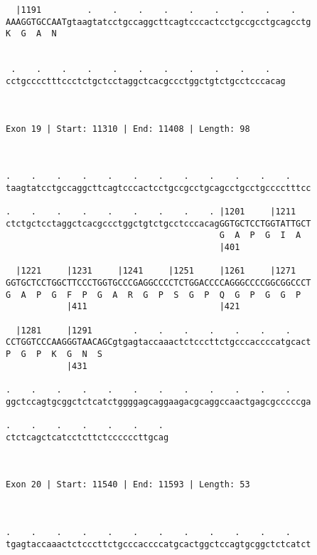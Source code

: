 \documentclass{article}
\begin{document}
\begin{Verbatim}
  |1191         .    .    .    .    .    .    .    .    .   
AAAGGTGCCAATgtaagtatcctgccaggcttcagtcccactcctgccgcctgcagcctg
K  G  A  N                                                  
                                                            
  
 .    .    .    .    .    .    .    .    .    .    .   
cctgcccctttccctctgctcctaggctcacgccctggctgtctgcctcccacag
                                                       
                                                       
 
Exon 19 | Start: 11310 | End: 11408 | Length: 98



.    .    .    .    .    .    .    .    .    .    .    .    
taagtatcctgccaggcttcagtcccactcctgccgcctgcagcctgcctgcccctttcc
                                                            
.    .    .    .    .    .    .    .    . |1201     |1211   
ctctgctcctaggctcacgccctggctgtctgcctcccacagGGTGCTCCTGGTATTGCT
                                          G  A  P  G  I  A  
                                          |401              
  
  |1221     |1231     |1241     |1251     |1261     |1271   
GGTGCTCCTGGCTTCCCTGGTGCCCGAGGCCCCTCTGGACCCCAGGGCCCCGGCGGCCCT
G  A  P  G  F  P  G  A  R  G  P  S  G  P  Q  G  P  G  G  P  
            |411                          |421              
  
  |1281     |1291        .    .    .    .    .    .    .    
CCTGGTCCCAAGGGTAACAGCgtgagtaccaaactctcccttctgcccaccccatgcact
P  G  P  K  G  N  S                                         
            |431                                            
  
.    .    .    .    .    .    .    .    .    .    .    .    
ggctccagtgcggctctcatctggggagcaggaagacgcaggccaactgagcgcccccga
                                                            
.    .    .    .    .    .    . 
ctctcagctcatcctcttctccccccttgcag
                                
                                
 
Exon 20 | Start: 11540 | End: 11593 | Length: 53



.    .    .    .    .    .    .    .    .    .    .    .    
tgagtaccaaactctcccttctgcccaccccatgcactggctccagtgcggctctcatct
                                                            

\end{Verbatim}
\end{document}
